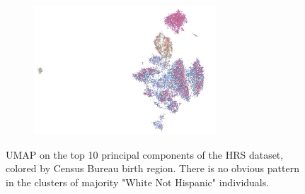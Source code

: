 \documentclass[12pt]{pnas-new}
\begin{document}
\begin{figure}
    \centering
    \begin{subfigure}{\textwidth}
    \includegraphics[width=0.75\textwidth]{images/HRS_1000G_NP1_UMAP_PC10_NC2_NN15_MD05_pca_1kgp_onto_hrs_umap_1kgp_onto_hrs_2018112221116_born.pdf}
    \end{subfigure}
    \caption{UMAP on the top 10 principal components of the HRS dataset, colored by Census Bureau birth region. There is no obvious pattern in the clusters of majority "White Not Hispanic" individuals.}
    \label{fig:supp_hrs_born}
\end{figure}
\end{document}
